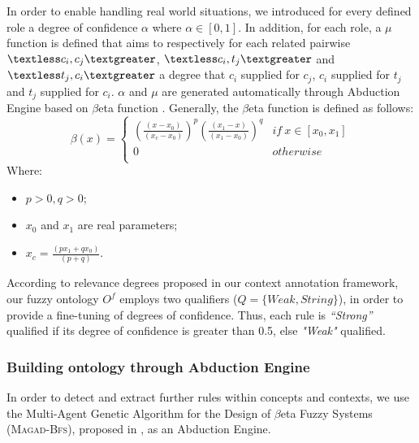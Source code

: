 						In order to enable handling real world situations, we introduced for every defined
						role a degree of confidence $\alpha$ where $\alpha \in [0,1]$.
						In addition, for each role, a $\mu$ function is defined that aims 
						to  respectively for each related pairwise $\textless c_{i},c_{j}
						\textgreater$, $\textless c_{i},t_{j}\textgreater$ and $\textless t_{j},c_{i}
						\textgreater$ a degree that $c_{i}$ supplied for $c_{j}$, $c_{i}$ supplied 
						for $t_{j}$ and $t_{j}$ supplied for $c_{i}$. $\alpha$ and $\mu$ are generated
						automatically through Abduction Engine based on $\beta$eta function \citep{Aouiti2003}. 
						Generally, the $\beta$eta function is defined as follows: 
						\begin{equation} 
							\beta(x) = 
							 \left\{ 
		   					\begin{array}{cr} 
		     						(\frac{(x-x_{0})}{(x_{c}-x_{0})})^{p} (\frac{(x_{1}-x)}
								{(x_{1}-x_{0})})^{q}&if~x \in [x_{0}, x_{1}] \\ 
		    						 0 & otherwise \\ 
		   					\end{array} 
		 					\right. 
						\end{equation} 
						Where: 
						\begin{itemize} 
							\item $p > 0, q > 0$; 
							\item $x_{0}$ and $x_{1}$ are real parameters; 
							\item $x_{c} = \frac{(px_{1}+qx_{0})}{(p+q)}$. 
						\end{itemize} 
		 
						According to relevance degrees proposed in our context annotation 
						framework, our fuzzy ontology $O^{f}$ employs two qualifiers 
						($Q = \{Weak, String\}$), in order to provide a fine-tuning 
						of degrees of confidence. Thus, each rule is
						\textit{“Strong”} qualified if its degree of confidence 
						is greater than 0.5, else \textit{"Weak"} qualified. 
		

	\subsubsection{Building ontology through Abduction Engine} 
			In order to detect and extract further rules within concepts and contexts, 
			we use the Multi-Agent Genetic Algorithm for the Design 
			of $\beta$eta Fuzzy Systems (\textsc{Magad-Bfs}), proposed in \citep{Kallel2006}, as an Abduction Engine. 
			 
